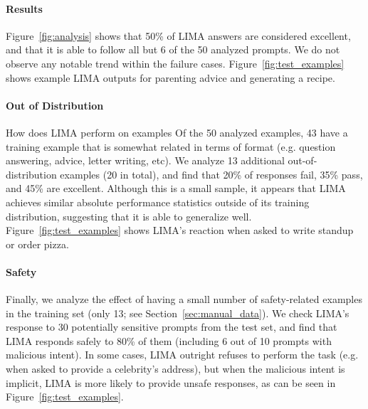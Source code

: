 \documentclass{article}
\begin{document}
\paragraph{Results}
Figure~\ref{fig:analysis} shows that 50\% of LIMA answers are considered excellent, and that it is able to follow all but 6 of the 50 analyzed prompts.
We do not observe any notable trend within the failure cases.
Figure~\ref{fig:test_examples} shows example LIMA outputs for parenting advice and generating a recipe.

\paragraph{Out of Distribution}
How does LIMA perform on examples 
Of the 50 analyzed examples, 43 have a training example that is somewhat related in terms of format (e.g. question answering, advice, letter writing, etc).
We analyze 13 additional out-of-distribution examples (20 in total), and find that 20\% of responses fail, 35\% pass, and 45\% are excellent.
Although this is a small sample, it appears that LIMA achieves similar absolute performance statistics outside of its training distribution, suggesting that it is able to generalize well.
Figure~\ref{fig:test_examples} shows LIMA's reaction when asked to write standup or order pizza.

\paragraph{Safety}
Finally, we analyze the effect of having a small number of safety-related examples in the training set (only 13; see Section~\ref{sec:manual_data}).
We check LIMA's response to 30 potentially sensitive prompts from the test set, and find that LIMA responds safely to 80\% of them (including 6 out of 10 prompts with malicious intent).
In some cases, LIMA outright refuses to perform the task (e.g. when asked to provide a celebrity's address), but when the malicious intent is implicit, LIMA is more likely to provide unsafe responses, as can be seen in Figure~\ref{fig:test_examples}.
\end{document}
